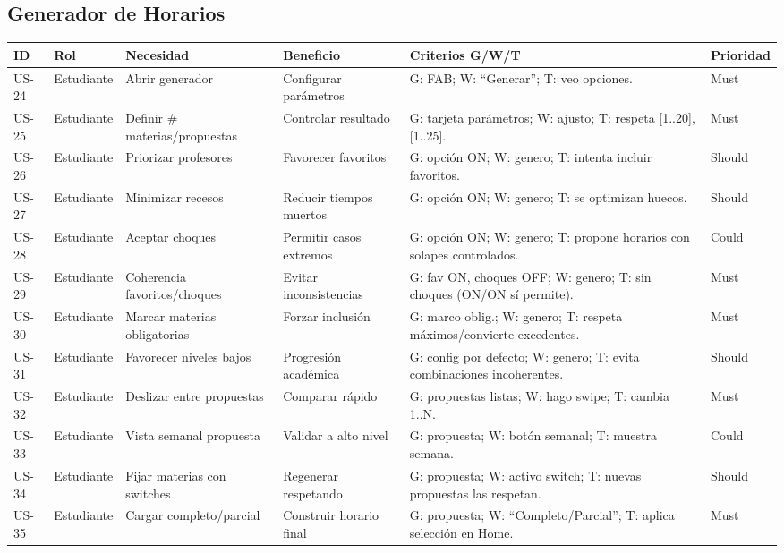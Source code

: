 \subsection{Generador de Horarios}
\small
\captionsetup{type=table}
\label{tab:hu_generador}
\begin{tabularx}{\linewidth}{@{}P{1.15cm}P{2.3cm}XP{2.3cm}XP{1.2cm}@{}}
\toprule
ID & Rol & Necesidad & Beneficio & Criterios G/W/T & Prioridad \\
\midrule
US-24 & Estudiante & Abrir generador & Configurar parámetros & G: FAB; W: ``Generar''; T: veo opciones. & Must \\
US-25 & Estudiante & Definir \# materias/propuestas & Controlar resultado & G: tarjeta parámetros; W: ajusto; T: respeta [1..20], [1..25]. & Must \\
US-26 & Estudiante & Priorizar profesores & Favorecer favoritos & G: opción ON; W: genero; T: intenta incluir favoritos. & Should \\
US-27 & Estudiante & Minimizar recesos & Reducir tiempos muertos & G: opción ON; W: genero; T: se optimizan huecos. & Should \\
US-28 & Estudiante & Aceptar choques & Permitir casos extremos & G: opción ON; W: genero; T: propone horarios con solapes controlados. & Could \\
US-29 & Estudiante & Coherencia favoritos/choques & Evitar inconsistencias & G: fav ON, choques OFF; W: genero; T: sin choques (ON/ON sí permite). & Must \\
US-30 & Estudiante & Marcar materias obligatorias & Forzar inclusión & G: marco oblig.; W: genero; T: respeta máximos/convierte excedentes. & Must \\
US-31 & Estudiante & Favorecer niveles bajos & Progresión académica & G: config por defecto; W: genero; T: evita combinaciones incoherentes. & Should \\
US-32 & Estudiante & Deslizar entre propuestas & Comparar rápido & G: propuestas listas; W: hago swipe; T: cambia 1..N. & Must \\
US-33 & Estudiante & Vista semanal propuesta & Validar a alto nivel & G: propuesta; W: botón semanal; T: muestra semana. & Could \\
US-34 & Estudiante & Fijar materias con switches & Regenerar respetando & G: propuesta; W: activo switch; T: nuevas propuestas las respetan. & Should \\
US-35 & Estudiante & Cargar completo/parcial & Construir horario final & G: propuesta; W: ``Completo/Parcial''; T: aplica selección en Home. & Must \\
\bottomrule
\end{tabularx}
\normalsize

